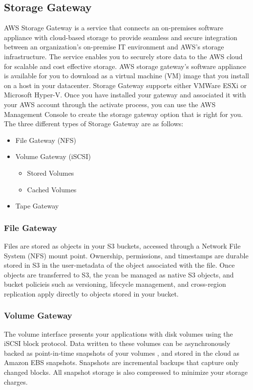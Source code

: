 \documentclass{article}
\begin{document}
	\subsection{Storage Gateway}
	AWS Storage Gateway is a service that connects an on-premises software appliance with cloud-based storage to provide seamless and secure integration between an organization's on-premise IT environment and AWS's storage infrastructure. The service enables you to securely store data to the AWS cloud for scalable and cost effective storage. AWS storage gateway's software appliance is available for you to download as a virtual machine (VM) image that you install on a host in your datacenter. Storage Gateway supports either VMWare ESXi or Microsoft Hyper-V. Once you have installed your gateway and associated it with your AWS account through the activate process, you can use the AWS Management Console to create the storage gateway option that is right for you. The three different types of Storage Gateway are as follows:
	\begin{itemize}
	\item
	File Gateway (NFS)
	
	\item
	Volume Gateway (iSCSI)
		\begin{itemize}
		\item
		Stored Volumes
		
		\item
		Cached Volumes
		\end{itemize}
		
	\item
	Tape Gateway
	\end{itemize}
		\subsubsection{File Gateway}
		Files are stored as objects in your S3 buckets, accessed through a Network File System (NFS) mount point. Ownership, permissions, and timestamps are durable stored in S3 in the user-metadata of the object associated with the file. Once objects are transferred to S3, the ycan be managed as native S3 objects, and bucket policieis such as versioning, lifecycle management, and cross-region replication apply directly to objects stored in your bucket.
		\subsubsection{Volume Gateway}
		The volume interface presents your applications with disk volumes using the iSCSI block protocol. Data written to these volumes can be asynchronously backed as point-in-time snapshots of your volumes , and stored in the cloud as Amazon EBS snapshots. Snapshots are incremental backups that capture only changed blocks. All snapshot storage is also compressed to minimize your storage charges. \\
		
\end{document}
